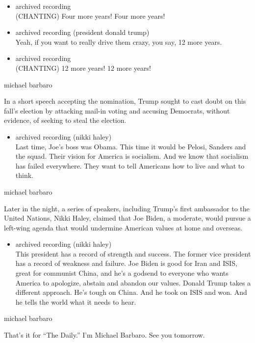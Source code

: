 \begin{itemize}
\item
  archived recording\\
  (CHANTING) Four more years! Four more years!
\item
  archived recording (president donald trump)\\
  Yeah, if you want to really drive them crazy, you say, 12 more years.
\item
  archived recording\\
  (CHANTING) 12 more years! 12 more years!
\end{itemize}

michael barbaro

In a short speech accepting the nomination, Trump sought to cast doubt
on this fall's election by attacking mail-in voting and accusing
Democrats, without evidence, of seeking to steal the election.

\begin{itemize}
\tightlist
\item
  archived recording (nikki haley)\\
  Last time, Joe's boss was Obama. This time it would be Pelosi, Sanders
  and the squad. Their vision for America is socialism. And we know that
  socialism has failed everywhere. They want to tell Americans how to
  live and what to think.
\end{itemize}

michael barbaro

Later in the night, a series of speakers, including Trump's first
ambassador to the United Nations, Nikki Haley, claimed that Joe Biden, a
moderate, would pursue a left-wing agenda that would undermine American
values at home and overseas.

\begin{itemize}
\tightlist
\item
  archived recording (nikki haley)\\
  This president has a record of strength and success. The former vice
  president has a record of weakness and failure. Joe Biden is good for
  Iran and ISIS, great for communist China, and he's a godsend to
  everyone who wants America to apologize, abstain and abandon our
  values. Donald Trump takes a different approach. He's tough on China.
  And he took on ISIS and won. And he tells the world what it needs to
  hear.
\end{itemize}

michael barbaro

That's it for ``The Daily.'' I'm Michael Barbaro. See you tomorrow.

